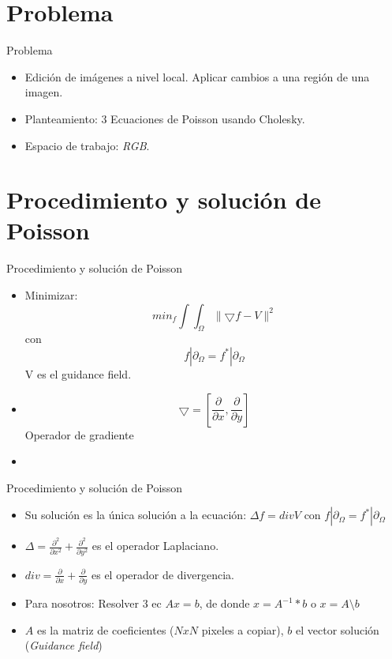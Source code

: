 \section{Problema}

\begin{frame}{Problema}
  \begin{itemize}
    \item Edición de imágenes a nivel local. Aplicar cambios a una región de una imagen.
    \item<2-> Planteamiento: 3 Ecuaciones de Poisson usando Cholesky.
    \item<3-> Espacio de trabajo: \textit{RGB}.
  \end{itemize}
\end{frame}

\section{Procedimiento y solución de Poisson}
\begin{frame}{Procedimiento y solución de Poisson}
  \begin{itemize}
    \item Minimizar: \[min_{f}\int \int_{\Omega} \parallel \bigtriangledown f-V\parallel^{2}\] con \[f|\partial_{\Omega}=f^{*}|\partial_{\Omega}\] V es el guidance field.
    \item<2-> \[\bigtriangledown =\left [\frac{\partial }{\partial x},\frac{\partial }{\partial y} \right ]\] Operador de gradiente
    \item<3->
  \end{itemize}
\end{frame}

\begin{frame}{Procedimiento y solución de Poisson}
  \begin{itemize}
    \item Su solución es la única solución a la ecuación: $\Delta f=div V$ con $f|\partial_{\Omega}=f^{*}|\partial_{\Omega}$
    \item<2-> $\Delta=\frac{\partial^2 }{\partial x^2}+\frac{\partial^2 }{\partial y^2}$ es el operador
    Laplaciano.
    \item<3-> $div=\frac{\partial }{\partial x}+\frac{\partial }{\partial y}$ es el operador de divergencia.
    \item<4-> Para nosotros: Resolver 3 ec $Ax=b$, de donde $x=A ^{-1}*b$ o $x=A\setminus b$
    \item<5-> $A$ es la matriz de coeficientes ($NxN$ pixeles a copiar), $b$ el vector solución (\textit{Guidance field})
  \end{itemize}
\end{frame}

